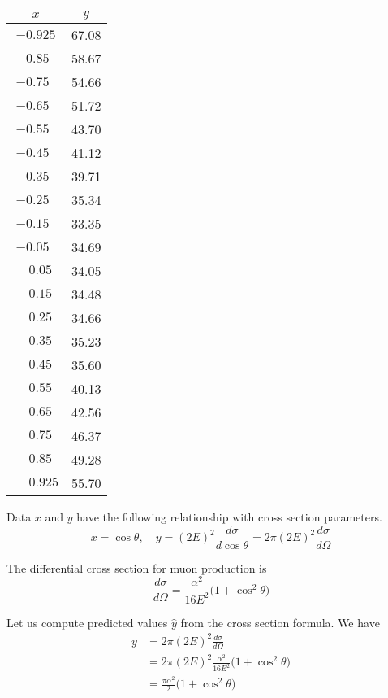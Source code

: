 \documentclass[12pt]{article}
\begin{document}
\begin{center}
\begin{tabular}{|c|c|}
\hline
$x$ & $y$\\
\hline
$-0.925$ & 67.08\\
$-0.85\phantom{0}$ & 58.67\\
$-0.75\phantom{0}$ & 54.66\\
$-0.65\phantom{0}$ & 51.72\\
$-0.55\phantom{0}$ & 43.70\\
$-0.45\phantom{0}$ & 41.12\\
$-0.35\phantom{0}$ & 39.71\\
$-0.25\phantom{0}$ & 35.34\\
$-0.15\phantom{0}$ & 33.35\\
$-0.05\phantom{0}$ & 34.69\\
$\phantom{+}0.05\phantom{0}$ & 34.05\\
$\phantom{+}0.15\phantom{0}$ & 34.48\\
$\phantom{+}0.25\phantom{0}$ & 34.66\\
$\phantom{+}0.35\phantom{0}$ & 35.23\\
$\phantom{+}0.45\phantom{0}$ & 35.60\\
$\phantom{+}0.55\phantom{0}$ & 40.13\\
$\phantom{+}0.65\phantom{0}$ & 42.56\\
$\phantom{+}0.75\phantom{0}$ & 46.37\\
$\phantom{+}0.85\phantom{0}$ & 49.28\\
$\phantom{+}0.925$ & 55.70\\
\hline
\end{tabular}
\end{center}

Data $x$ and $y$ have the following relationship with cross section parameters.
\begin{equation*}
x=\cos\theta,
\quad
y=(2E)^2\frac{d\sigma}{d\cos\theta}=2\pi(2E)^2\frac{d\sigma}{d\Omega}
\end{equation*}

The differential cross section for muon production is
\begin{equation*}
\frac{d\sigma}{d\Omega}=\frac{\alpha^2}{16E^2}\big(1+\cos^2\theta\big)
\end{equation*}

Let us compute predicted values $\hat{y}$ from the cross section formula.
We have
\begin{align*}
y&=2\pi(2E)^2\frac{d\sigma}{d\Omega}
\\
&=2\pi(2E)^2\frac{\alpha^2}{16E^2}\big(1+\cos^2\theta\big)
\\
&=\frac{\pi\alpha^2}{2}\big(1+\cos^2\theta\big)
\end{align*}
\end{document}
